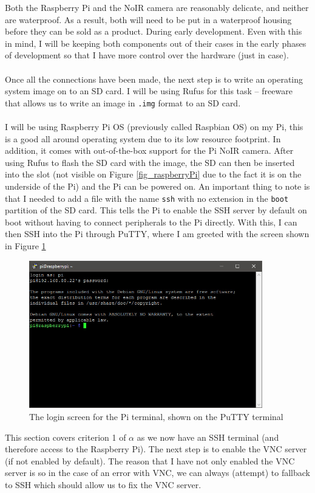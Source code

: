 \documentclass[9pt]{article}
\begin{document}
Both the Raspberry Pi and the NoIR camera are reasonably delicate, and neither are waterproof. As a result, both will need to be put in a waterproof housing before they can be sold as a product. During early development. Even with this in mind, I will be keeping both components out of their cases in the early phases of development so that I have more control over the hardware (just in case).\\\\
Once all the connections have been made, the next step is to write an operating system image on to an SD card. I will be using Rufus\cite{Rufus} for this task -- freeware that allows us to write an image in \texttt{.img} format to an SD card.\\\\
I will be using Raspberry Pi OS\cite{raspberryPi} (previously called Raspbian OS) on my Pi, this is a good all around operating system due to its low resource footprint. In addition, it comes with out-of-the-box support for the Pi NoIR camera. After using Rufus to flash the SD card with the image, the SD can then be inserted into the slot (not visible on Figure \ref{fig_raspberryPi} due to the fact it is on the underside of the Pi) and the Pi can be powered on.
An important thing to note is that I needed to add a file with the name \texttt{ssh} with no extension in the \texttt{boot} partition of the SD card. This tells the Pi to enable the SSH server by default on boot without having to connect peripherals to the Pi directly. With this, I can then SSH into the Pi through PuTTY, where I am greeted with the screen shown in Figure \ref{fig_raspberryPiBoot}
\begin{figure}[H]
	\centering
	\includegraphics[width=4in]{raspberryPiBoot.png}
	\caption{The login screen for the Pi terminal, shown on the PuTTY terminal}\label{fig_raspberryPiBoot}
\end{figure}
This section covers criterion 1 of $\alpha$ as we now have an SSH terminal (and therefore access to the Raspberry Pi). The next step is to enable the VNC server (if not enabled by default). The reason that I have not only enabled the VNC server is so in the case of an error with VNC, we can always (attempt) to fallback to SSH which should allow us to fix the VNC server.
\end{document}
